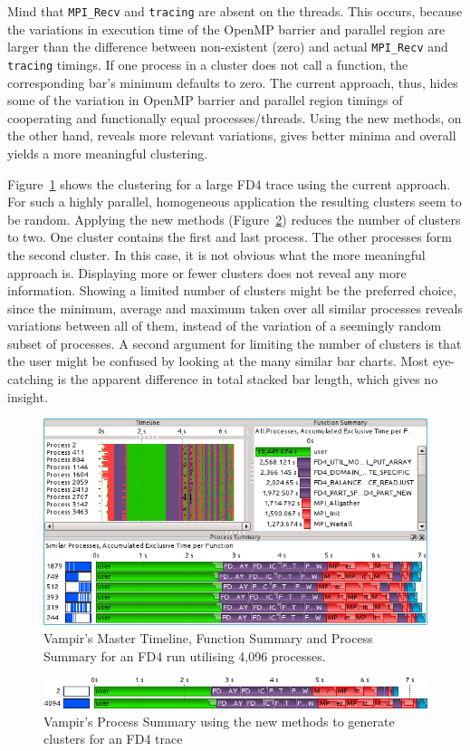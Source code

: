 \documentclass[a4paper, final, diplominf]{zih-template}
\begin{document}
Mind that \texttt{MPI\_Recv} and \texttt{tracing} are absent on the threads.
This occurs, because the variations in execution time of the OpenMP barrier and parallel region are larger than the difference between non-existent (zero) and actual \texttt{MPI\_Recv} and \texttt{tracing} timings.
If one process in a cluster does not call a function, the corresponding bar's minimum defaults to zero.
The current approach, thus, hides some of the variation in OpenMP barrier and parallel region timings of cooperating and functionally equal processes/threads.
Using the new methods, on the other hand, reveals more relevant variations, gives better minima and overall yields a more meaningful clustering.

Figure~\ref{fig:fd4-4096p-old-clustering} shows the clustering for a large FD4 trace using the current approach.
For such a highly parallel, homogeneous application the resulting clusters seem to be random.
Applying the new methods (Figure~\ref{fig:fd4-4096p-new-clustering}) reduces the number of clusters to two.
One cluster contains the first and last process.
The other processes form the second cluster.
In this case, it is not obvious what the more meaningful approach is.
Displaying more or fewer clusters does not reveal any more information.
Showing a limited number of clusters might be the preferred choice, since the minimum, average and maximum taken over all similar processes reveals variations between all of them, instead of the variation of a seemingly random subset of processes.
A second argument for limiting the number of clusters is that the user might be confused by looking at the many similar bar charts.
Most eye-catching is the apparent difference in total stacked bar length, which gives no insight.
\begin{figure}[tb]
	\centering
	\includegraphics[width=13.08cm]{fd4-4096p-old-clustering}
	\caption{Vampir's Master Timeline, Function Summary and Process Summary for an FD4 run utilising 4,096 processes.}
	\label{fig:fd4-4096p-old-clustering}
\end{figure}
\begin{figure}[tb]
	\centering
	\includegraphics[width=13cm]{fd4-4096p-new-clustering}
	\caption{Vampir's Process Summary using the new methods to generate clusters for an FD4 trace}
	\label{fig:fd4-4096p-new-clustering}
\end{figure}
\end{document}
